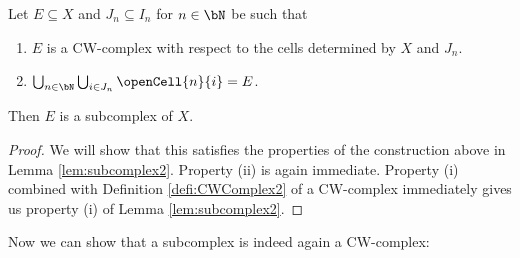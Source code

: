 \begin{lem}\label{lem:subcomplex''}
    Let $E \subseteq X$ and $J_n \subseteq I_n$ for $n \in \bN$ be such that 
    \begin{enumerate}
        \item $E$ is a CW-complex with respect to the cells determined by $X$ and $J_n$.
        \item $\bigcup_{n \in \bN} \bigcup_{i \in J_n} \openCell{n}{i} = E$.
    \end{enumerate}
    Then $E$ is a subcomplex of $X$. 
    \href{https://github.com/scholzhannah/CWComplexes/blob/7be4872a05b534011cc969eb5b80a4b7f0bf57e2/CWcomplexes/subcomplex.lean#L54-L80}{\faExternalLink}
\end{lem}
\begin{proof}
    We will show that this satisfies the properties of the construction above in Lemma \ref{lem:subcomplex2}.
    Property (ii) is again immediate. 
    Property (i) combined with Definition \ref{defi:CWComplex2} of a CW-complex immediately gives us property (i) of Lemma \ref{lem:subcomplex2}.
\end{proof}

Now we can show that a subcomplex is indeed again a CW-complex: 

